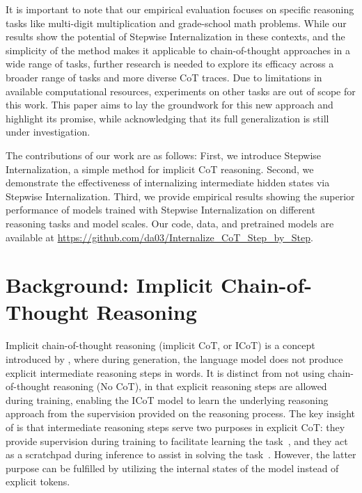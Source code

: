 \documentclass{article}
\begin{document}
It is important to note that our empirical evaluation focuses on specific reasoning tasks like multi-digit multiplication and grade-school math problems. While our results show the potential of Stepwise Internalization in these contexts, and the simplicity of the method makes it applicable to chain-of-thought approaches in a wide range of tasks, further research is needed to explore its efficacy across a broader range of tasks and more diverse CoT traces. Due to limitations in available computational resources, experiments on other tasks are out of scope for this work. This paper aims to lay the groundwork for this new approach and highlight its promise, while acknowledging that its full generalization is still under investigation.

The contributions of our work are as follows: First, we introduce Stepwise Internalization, a simple method for implicit CoT reasoning. Second, we demonstrate the effectiveness of internalizing intermediate hidden states via Stepwise Internalization. Third, we provide empirical results showing the superior performance of models trained with Stepwise Internalization on different reasoning tasks and model scales. Our code, data, and pretrained models are available at \url{https://github.com/da03/Internalize_CoT_Step_by_Step}.

\section{Background: Implicit Chain-of-Thought Reasoning}
Implicit chain-of-thought reasoning (implicit CoT, or ICoT) is a concept introduced by \citet{deng2023implicit}, where during generation, the language model does not produce explicit intermediate reasoning steps in words. It is distinct from not using chain-of-thought reasoning (No CoT), in that explicit reasoning steps are allowed during training, enabling the ICoT model to learn the underlying reasoning approach from the supervision provided on the reasoning process. The key insight of \citet{deng2023implicit} is that intermediate reasoning steps serve two purposes in explicit CoT: they provide supervision during training to facilitate learning the task~\citep{nye2021work}, and they act as a scratchpad during inference to assist in solving the task~\citep{wei2022chain}. However, the latter purpose can be fulfilled by utilizing the internal states of the model instead of explicit tokens.
\end{document}
